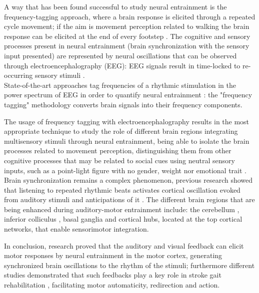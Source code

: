 A way that has been found successful to study neural entrainment is the frequency-tagging approach, where a brain response is elicited through a repeated cycle movement; if the aim is movement perception related to walking the brain response can be elicited at the end of every footstep \parencite{Cracco_2022}. The cognitive and sensory processes present in neural entrainment (brain synchronization with the sensory input presented) are represented by neural oscillations that can be observed through electroencephalography (EEG): EEG signals result in time-locked to re-occurring sensory stimuli \parencite{Thut_2012}. \\
State-of-the-art approaches tag frequencies of a rhythmic stimulation in the power spectrum of EEG in order to quantify neural entrainment \parencite{Nozaradan_2011}: the "frequency tagging" methodology converts brain signals into their frequency components. 

The usage of frequency tagging with electroencephalography results in the most appropriate technique to study the role of different brain regions integrating multisensory stimuli through neural entrainment, being able to isolate the brain processes related to movement perception, distinguishing them from other cognitive processes that may be related to social cues using neutral sensory inputs, such as a point-light figure with no gender, weight nor emotional trait \parencite{Cracco_2022}. \\
Brain synchronization remains a complex phenomenon, previous research showed that listening to repeated rhythmic beats activates cortical oscillation evoked from auditory stimuli and anticipations of it \parencite{Snyder_2005}. The different brain regions that are being enhanced during auditory-motor entrainment include: the cerebellum \parencite{Grahn_2011}, inferior colliculus \parencite{Tierney_2013}, basal ganglia \parencite{Thaut_2009} and cortical hubs, located at the top cortical networks, that enable sensorimotor integration.

In conclusion, research proved that the auditory and visual feedback can elicit motor responses by neural entrainment in the motor cortex, generating synchronized brain oscillations to the rhythm of the stimuli; furthermore different studies demonstrated that such feedbacks play a key role in stroke gait rehabilitation \parencite{Chen_2018}, facilitating motor automaticity, redirection and action.

